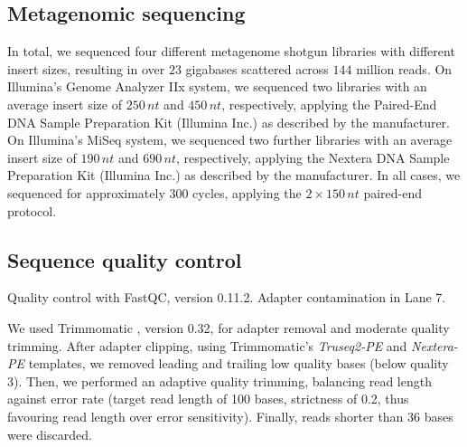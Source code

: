 \documentclass{bmcart}
\begin{document}
\subsection*{Metagenomic sequencing}
In total, we sequenced four different metagenome shotgun libraries with different insert sizes, resulting in over $23$ gigabases scattered across $144$ million reads.
On Illumina's Genome Analyzer IIx system, we sequenced two libraries with an average insert size of $250\,nt$ and $450\,nt$, respectively, applying the Paired-End DNA Sample Preparation Kit (Illumina Inc.) as described by the manufacturer.
On Illumina's MiSeq system, we sequenced two further libraries with an average insert size of $190\,nt$ and $690\,nt$, respectively, applying the Nextera DNA Sample Preparation Kit (Illumina Inc.) as described by the manufacturer.
In all cases, we sequenced for approximately 300 cycles, applying the $2 \times 150\,nt$ paired-end protocol.
%
\subsection*{Sequence quality control}
Quality control with FastQC, version 0.11.2. Adapter contamination in Lane 7.

We used Trimmomatic \cite{Trimmomatic}, version 0.32, for adapter removal and moderate quality trimming.
After adapter clipping, using Trimmomatic's \emph{Truseq2-PE} and \emph{Nextera-PE} templates, we removed leading and trailing low quality bases (below quality 3).
Then, we performed an adaptive quality trimming, balancing read length against error rate (target read length of 100 bases, strictness of 0.2, thus favouring read length over error sensitivity).
Finally, reads shorter than $36$ bases were discarded.
\end{document}

